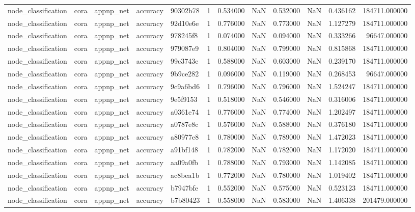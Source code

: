 \begin{tabular}{lllllrrrrrrr}
node_classification & cora & appnp_net & accuracy & 90302b78 & 1 & 0.534000 & NaN & 0.532000 & NaN & 0.436162 & 184711.000000 \\
node_classification & cora & appnp_net & accuracy & 92d10e6e & 1 & 0.776000 & NaN & 0.773000 & NaN & 1.127279 & 184711.000000 \\
node_classification & cora & appnp_net & accuracy & 978245f8 & 1 & 0.074000 & NaN & 0.094000 & NaN & 0.333266 & 96647.000000 \\
node_classification & cora & appnp_net & accuracy & 979087e9 & 1 & 0.804000 & NaN & 0.799000 & NaN & 0.815868 & 184711.000000 \\
node_classification & cora & appnp_net & accuracy & 99c3743e & 1 & 0.588000 & NaN & 0.603000 & NaN & 0.239170 & 184711.000000 \\
node_classification & cora & appnp_net & accuracy & 9b9ce282 & 1 & 0.096000 & NaN & 0.119000 & NaN & 0.268453 & 96647.000000 \\
node_classification & cora & appnp_net & accuracy & 9c9a6bd6 & 1 & 0.796000 & NaN & 0.796000 & NaN & 1.524247 & 184711.000000 \\
node_classification & cora & appnp_net & accuracy & 9e5f9153 & 1 & 0.518000 & NaN & 0.546000 & NaN & 0.316006 & 184711.000000 \\
node_classification & cora & appnp_net & accuracy & a0361e74 & 1 & 0.776000 & NaN & 0.774000 & NaN & 1.202497 & 184711.000000 \\
node_classification & cora & appnp_net & accuracy & a0787e8c & 1 & 0.576000 & NaN & 0.588000 & NaN & 0.376180 & 184711.000000 \\
node_classification & cora & appnp_net & accuracy & a80977e8 & 1 & 0.780000 & NaN & 0.789000 & NaN & 1.472023 & 184711.000000 \\
node_classification & cora & appnp_net & accuracy & a91bf148 & 1 & 0.782000 & NaN & 0.782000 & NaN & 1.172020 & 184711.000000 \\
node_classification & cora & appnp_net & accuracy & aa09a0fb & 1 & 0.788000 & NaN & 0.793000 & NaN & 1.142085 & 184711.000000 \\
node_classification & cora & appnp_net & accuracy & ac8bea1b & 1 & 0.772000 & NaN & 0.780000 & NaN & 1.019402 & 184711.000000 \\
node_classification & cora & appnp_net & accuracy & b7947bfe & 1 & 0.552000 & NaN & 0.575000 & NaN & 0.523123 & 184711.000000 \\
node_classification & cora & appnp_net & accuracy & b7b80423 & 1 & 0.558000 & NaN & 0.583000 & NaN & 1.406338 & 201479.000000 \\

\end{tabular}
